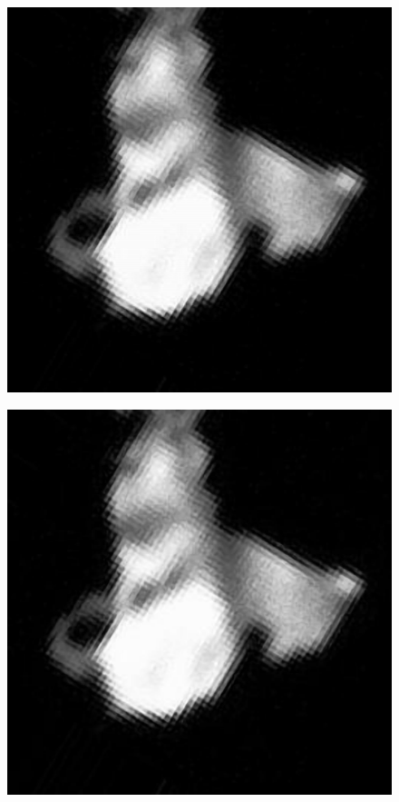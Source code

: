 \begin{figure}[h!]
	\centering
	\begin{minipage}{.5\textwidth}
		\centering
		\includegraphics[width=0.8\linewidth]{inc/img/us_fsrcnn_x4}
		\label{fig:us_fsrcnn_x4}
	\end{minipage}%
	\begin{minipage}{.5\textwidth}
		\centering
		\includegraphics[width=0.8\linewidth]{inc/img/us_lapsrn_x4}
		\label{fig:us_lapsrn_x4}
	\end{minipage}
\end{figure}

